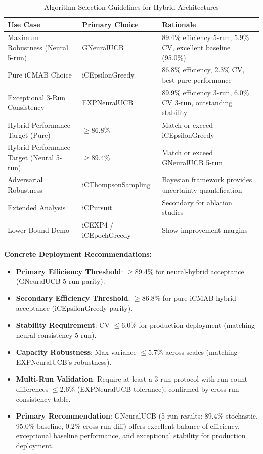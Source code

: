 \documentclass[12pt,a4paper]{article}
\begin{document}
\begin{table}[H]
\centering
\caption{Algorithm Selection Guidelines for Hybrid Architectures}
\begin{tabular}{@{}lll@{}}
\toprule
\textbf{Use Case} & \textbf{Primary Choice} & \textbf{Rationale} \\
\midrule
Maximum Robustness (Neural 5-run) & GNeuralUCB & 89.4\% efficiency 5-run, 5.9\% CV, excellent baseline (95.0\%) \\
Pure iCMAB Choice & iCEpsilonGreedy & 86.8\% efficiency, 2.3\% CV, best pure performance \\
Exceptional 3-Run Consistency & EXPNeuralUCB & 89.9\% efficiency 3-run, 6.0\% CV 3-run, outstanding stability \\
Hybrid Performance Target (Pure) & $\geq$86.8\% & Match or exceed iCEpsilonGreedy \\
Hybrid Performance Target (Neural 5-run) & $\geq$89.4\% & Match or exceed GNeuralUCB 5-run \\
Adversarial Robustness & iCThompsonSampling & Bayesian framework provides uncertainty quantification \\
Extended Analysis & iCPursuit & Secondary for ablation studies \\
Lower-Bound Demo & iCEXP4 / iCEpochGreedy & Show improvement margins \\
\bottomrule
\end{tabular}
\end{table}

\textbf{Concrete Deployment Recommendations:}
\begin{itemize}
\item \textbf{Primary Efficiency Threshold}: $\geq$89.4\% for neural-hybrid acceptance (GNeuralUCB 5-run parity).
\item \textbf{Secondary Efficiency Threshold}: $\geq$86.8\% for pure-iCMAB hybrid acceptance (iCEpsilonGreedy parity).
\item \textbf{Stability Requirement}: CV $\leq$6.0\% for production deployment (matching neural consistency 5-run).
\item \textbf{Capacity Robustness}: Max variance $\leq$5.7\% across scales (matching EXPNeuralUCB's robustness).
\item \textbf{Multi-Run Validation}: Require at least a 3-run protocol with run-count differences $\leq$2.6\% (EXPNeuralUCB tolerance), confirmed by cross-run consistency table.
\item \textbf{Primary Recommendation}: GNeuralUCB (5-run results: 89.4\% stochastic, 95.0\% baseline, 0.2\% cross-run diff) offers excellent balance of efficiency, exceptional baseline performance, and exceptional stability for production deployment.
\end{itemize}
\end{document}
